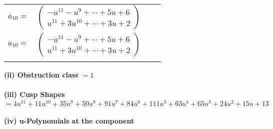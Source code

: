 \documentclass[1p]{elsarticle_modified}
\theoremstyle{definition}
\begin{document}
\begin{tabular}{m{7pt} m{180pt} m{7pt} m{180pt} }
\flushright $a_{10}=$&$\begin{pmatrix}- u^{11}- u^9+\cdots+5 u+6\\u^{11}+3 u^{10}+\cdots+3 u+2\end{pmatrix}$\\ \flushright $a_{10}=$&$\begin{pmatrix}- u^{11}- u^9+\cdots+5 u+6\\u^{11}+3 u^{10}+\cdots+3 u+2\end{pmatrix}$\\&\end{tabular}
\flushleft \textbf{(ii) Obstruction class $= 1$}\\~\\
\flushleft \textbf{(iii) Cusp Shapes $= 4 u^{11}+11 u^{10}+35 u^9+50 u^8+91 u^7+84 u^6+111 u^5+63 u^4+65 u^3+24 u^2+15 u+13$}\\~\\
\newpage\renewcommand{\arraystretch}{1}
\flushleft \textbf{(iv) u-Polynomials at the component}\newline \\
\end{document}
